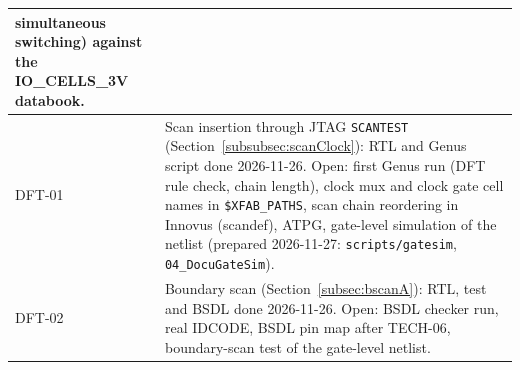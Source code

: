 \begin{table}[H]
\begin{tabularx}{\textwidth}{|l |X|}
            simultaneous switching) against the IO\_CELLS\_3V databook. \\
  \hline
  DFT-01 & Scan insertion through JTAG \texttt{SCANTEST}
            (Section~\ref{subsubsec:scanClock}): RTL and Genus script done
            2026-11-26. Open: first Genus run (DFT rule check, chain length),
            clock mux and clock gate cell names in \texttt{\$XFAB\_PATHS},
            scan chain reordering in Innovus (scandef), ATPG, gate-level
            simulation of the netlist (prepared 2026-11-27:
            \texttt{scripts/gatesim}, \texttt{04\_DocuGateSim}). \\
  \hline
  DFT-02 & Boundary scan (Section~\ref{subsec:bscanA}): RTL, test and BSDL
            done 2026-11-26. Open: BSDL checker run, real IDCODE, BSDL pin map
            after TECH-06, boundary-scan test of the gate-level netlist. \\
  \hline
\end{tabularx}
\end{table}
